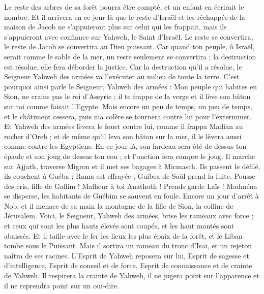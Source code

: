 \begin{multicols}{2}
Le reste des arbres de sa forêt pourra être compté, et un enfant en écrirait le nombre.
Et il arrivera en ce jour-là que le reste d'Israël et les réchappés de la maison de Jacob ne s'appuieront plus sur celui qui les frappait, mais ils s'appuieront avec confiance sur Yahweh, le Saint d'Israël.
Le reste se convertira, le reste de Jacob se convertira au Dieu puissant.
Car quand ton peuple, ô Israël, serait comme le sable de la mer, un reste seulement se convertira ; la destruction est résolue, elle fera déborder la justice.
Car la destruction qu'il a résolue, le Seigneur Yahweh des armées va l'exécuter au milieu de toute la terre.
C'est pourquoi ainsi parle le Seigneur, Yahweh des armées : Mon peuple qui habites en Sion, ne crains pas le roi d'Assyrie ; il te frappe de la verge et il lève son bâton sur toi comme faisait l'Egypte.
Mais encore un peu de temps, un peu de temps, et le châtiment cessera, puis ma colère se tournera contre lui pour l'exterminer.
Et Yahweh des armées lèvera le fouet contre lui, comme il frappa Madian au rocher d'Oreb ; et de même qu'il leva son bâton sur la mer, il le lèvera aussi comme contre les Egyptiens.
En ce jour-là, son fardeau sera ôté de dessus ton épaule et son joug de dessus ton cou ; et l'onction fera rompre le joug.
Il marche sur Ajjath, traverse Migron et il met ses bagages à Micmasch.
Ils passent le défilé, ils couchent à Guéba ; Rama est effrayée ; Guibea de Saül prend la fuite.
Pousse des cris, fille de Gallim ! Malheur à toi Anathoth ! Prends garde Laïs !
Madména se disperse, les habitants de Guébim se sauvent en foule.
Encore un jour d'arrêt à Nob, et il menace de sa main la montagne de la fille de Sion, la colline de Jérusalem.
Voici, le Seigneur, Yahweh des armées, brise les rameaux avec force ; et ceux qui sont les plus hauts élevés sont coupés, et les haut montés sont abaissés.
Et il taille avec le fer les lieux les plus épaix de la forêt, et le Liban tombe sous le Puissant.
\VerseOne{}Mais il sortira un rameau du tronc d'Isaï, et un rejeton naîtra de ses racines.
L'Esprit de Yahweh reposera sur lui, Esprit de sagesse et d'intelligence, Esprit de conseil et de force, Esprit de connaissance et de crainte de Yahweh.
Il respirera la crainte de Yahweh, il ne jugera point sur l'apparence et il ne reprendra point sur un ouï-dire.

\end{multicols}
